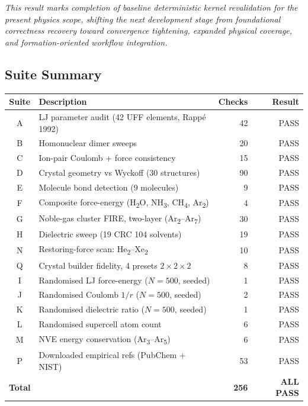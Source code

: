 \documentclass[11pt]{article}
\begin{document}
\medskip\noindent\textit{This result marks completion of baseline deterministic
kernel revalidation for the present physics scope, shifting the next development
stage from foundational correctness recovery toward convergence tightening,
expanded physical coverage, and formation-oriented workflow integration.}

\subsection{Suite Summary}

\begin{center}
\begin{tabular}{clrr}
\toprule
Suite & Description & Checks & Result \\
\midrule
A & LJ parameter audit (42 UFF elements, Rapp\'{e} 1992) & 42 & PASS \\
B & Homonuclear dimer sweeps & 20 & PASS \\
C & Ion-pair Coulomb + force consistency & 15 & PASS \\
D & Crystal geometry vs Wyckoff (30 structures) & 90 & PASS \\
E & Molecule bond detection (9 molecules) & 9 & PASS \\
F & Composite force-energy (H\textsubscript{2}O, NH\textsubscript{3}, CH\textsubscript{4}, Ar\textsubscript{2}) & 4 & PASS \\
G & Noble-gas cluster FIRE, two-layer (Ar\textsubscript{2}--Ar\textsubscript{7}) & 30 & PASS \\
H & Dielectric sweep (19 CRC 104 solvents) & 19 & PASS \\
N & Restoring-force scan: He\textsubscript{2}--Xe\textsubscript{2} & 10 & PASS \\
Q & Crystal builder fidelity, 4 presets $2\times2\times2$ & 8 & PASS \\
I & Randomised LJ force-energy ($N=500$, seeded) & 1 & PASS \\
J & Randomised Coulomb $1/r$ ($N=500$, seeded) & 2 & PASS \\
K & Randomised dielectric ratio ($N=500$, seeded) & 1 & PASS \\
L & Randomised supercell atom count & 6 & PASS \\
M & NVE energy conservation (Ar\textsubscript{3}--Ar\textsubscript{5}) & 6 & PASS \\
P & Downloaded empirical refs (PubChem + NIST) & 53 & PASS \\
\midrule
\textbf{Total} & & \textbf{256} & \textbf{ALL PASS} \\
\bottomrule
\end{tabular}
\end{center}
\end{document}
